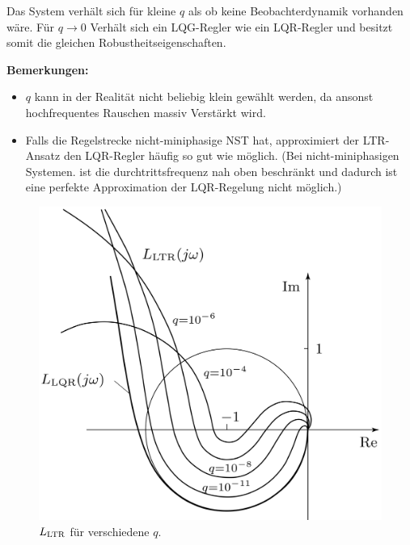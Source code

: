         Das System verhält sich für kleine $q$ als ob keine Beobachterdynamik vorhanden wäre. Für $q\to 0$ Verhält sich ein LQG-Regler wie ein LQR-Regler und besitzt somit die gleichen Robustheitseigenschaften.
        
        \textbf{Bemerkungen:}
        \begin{itemize}
            \item $q$ kann in der Realität nicht beliebig klein gewählt werden, da ansonst hochfrequentes Rauschen massiv Verstärkt wird.
            
            \item Falls die Regelstrecke nicht-miniphasige NST hat, approximiert der LTR-Ansatz den LQR-Regler häufig so gut wie möglich. (Bei nicht-miniphasigen Systemen. ist die durchtrittsfrequenz nah oben beschränkt und dadurch ist eine perfekte Approximation der LQR-Regelung nicht möglich.)
        \end{itemize}
        
        \begin{figure}[H]
            \centering
            \includegraphics[width = 0.6\linewidth]{images/11/L_LTR.jpeg}
            \caption{$L_{\textnormal{LTR}}$ für verschiedene $q$.}
        \end{figure}
        